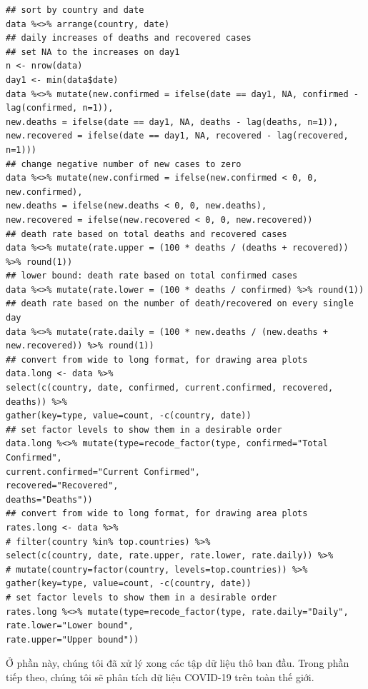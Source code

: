 \documentclass[12pt, a4paper,oneside]{book}
\theoremstyle{definition}
\begin{document}
\begin{lstlisting}
## sort by country and date
data %<>% arrange(country, date)
## daily increases of deaths and recovered cases
## set NA to the increases on day1
n <- nrow(data)
day1 <- min(data$date)
data %<>% mutate(new.confirmed = ifelse(date == day1, NA, confirmed - lag(confirmed, n=1)),
new.deaths = ifelse(date == day1, NA, deaths - lag(deaths, n=1)),
new.recovered = ifelse(date == day1, NA, recovered - lag(recovered, n=1)))
## change negative number of new cases to zero
data %<>% mutate(new.confirmed = ifelse(new.confirmed < 0, 0, new.confirmed),
new.deaths = ifelse(new.deaths < 0, 0, new.deaths),
new.recovered = ifelse(new.recovered < 0, 0, new.recovered))
## death rate based on total deaths and recovered cases
data %<>% mutate(rate.upper = (100 * deaths / (deaths + recovered)) %>% round(1))
## lower bound: death rate based on total confirmed cases
data %<>% mutate(rate.lower = (100 * deaths / confirmed) %>% round(1))
## death rate based on the number of death/recovered on every single day
data %<>% mutate(rate.daily = (100 * new.deaths / (new.deaths + new.recovered)) %>% round(1))
## convert from wide to long format, for drawing area plots
data.long <- data %>%
select(c(country, date, confirmed, current.confirmed, recovered, deaths)) %>%
gather(key=type, value=count, -c(country, date))
## set factor levels to show them in a desirable order
data.long %<>% mutate(type=recode_factor(type, confirmed="Total Confirmed",
current.confirmed="Current Confirmed",
recovered="Recovered",
deaths="Deaths"))
## convert from wide to long format, for drawing area plots
rates.long <- data %>%
# filter(country %in% top.countries) %>%
select(c(country, date, rate.upper, rate.lower, rate.daily)) %>%
# mutate(country=factor(country, levels=top.countries)) %>%
gather(key=type, value=count, -c(country, date))
# set factor levels to show them in a desirable order
rates.long %<>% mutate(type=recode_factor(type, rate.daily="Daily",
rate.lower="Lower bound",
rate.upper="Upper bound"))
\end{lstlisting}
Ở phần này, chúng tôi đã xử lý xong các tập dữ liệu thô ban đầu. Trong phần tiếp theo, chúng tôi sẽ phân tích dữ liệu COVID-19 trên toàn thế giới.
\end{document}
